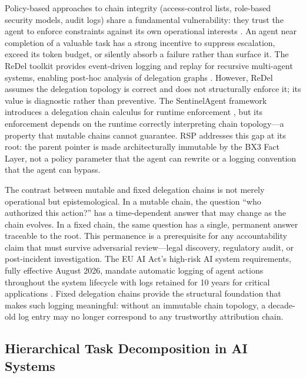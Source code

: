 \documentclass[11pt,oneside]{article}
\begin{document}
Policy-based approaches to chain integrity (access-control lists, role-based security models, audit logs) share a fundamental vulnerability: they trust the agent to enforce constraints against its own operational interests \cite{nist2023}. An agent near completion of a valuable task has a strong incentive to suppress escalation, exceed its token budget, or silently absorb a failure rather than surface it. The ReDel toolkit provides event-driven logging and replay for recursive multi-agent systems, enabling post-hoc analysis of delegation graphs \cite{redel2025arxiv}. However, ReDel assumes the delegation topology is correct and does not structurally enforce it; its value is diagnostic rather than preventive. The SentinelAgent framework introduces a delegation chain calculus for runtime enforcement \cite{sentinelagent2025arxiv}, but its enforcement depends on the runtime correctly interpreting chain topology---a property that mutable chains cannot guarantee. RSP addresses this gap at its root: the parent pointer is made architecturally immutable by the BX3 Fact Layer, not a policy parameter that the agent can rewrite or a logging convention that the agent can bypass.

The contrast between mutable and fixed delegation chains is not merely operational but epistemological. In a mutable chain, the question ``who authorized this action?'' has a time-dependent answer that may change as the chain evolves. In a fixed chain, the same question has a single, permanent answer traceable to the root. This permanence is a prerequisite for any accountability claim that must survive adversarial review---legal discovery, regulatory audit, or post-incident investigation. The EU AI Act's high-risk AI system requirements, fully effective August 2026, mandate automatic logging of agent actions throughout the system lifecycle with logs retained for 10 years for critical applications \cite{eu_ai_act}. Fixed delegation chains provide the structural foundation that makes such logging meaningful: without an immutable chain topology, a decade-old log entry may no longer correspond to any trustworthy attribution chain.

\subsection{Hierarchical Task Decomposition in AI Systems}\label{sec:task-decomposition}
\end{document}
